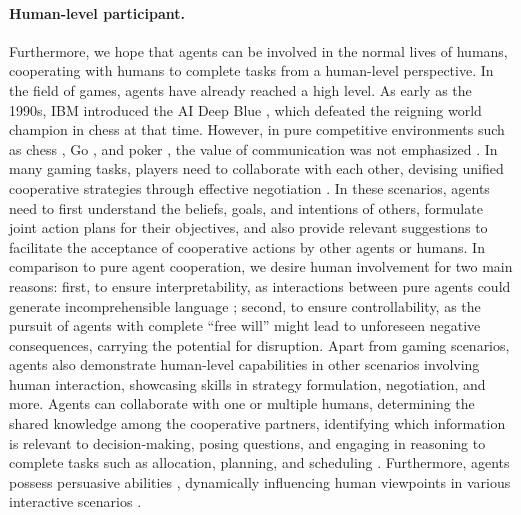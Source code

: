 \paragraph{Human-level participant.}
Furthermore, we hope that agents can be involved in the normal lives of humans, cooperating with humans to complete tasks from a human-level perspective. In the field of games, agents have already reached a high level. As early as the 1990s, IBM introduced the AI Deep Blue \cite{Campbell2002DeepB}, which defeated the reigning world champion in chess at that time. However, in pure competitive environments such as chess \cite{Campbell2002DeepB}, Go \cite{DBLP:journals/nature/SilverHMGSDSAPL16}, and poker \cite{DBLP:journals/corr/MoravcikSBLMBDW17}, the value of communication was not emphasized \cite{meta2022human}. In many gaming tasks, players need to collaborate with each other, devising unified cooperative strategies through effective negotiation \cite{DBLP:conf/iclr/Bakhtin0LGJFMB23,meta2022human,DBLP:conf/nips/CarrollSHGSAD19, bard2020hanabi}. In these scenarios, agents need to first understand the beliefs, goals, and intentions of others, formulate joint action plans for their objectives, and also provide relevant suggestions to facilitate the acceptance of cooperative actions by other agents or humans. In comparison to pure agent cooperation, we desire human involvement for two main reasons: first, to ensure interpretability, as interactions between pure agents could generate incomprehensible language \cite{DBLP:conf/nips/CarrollSHGSAD19}; second, to ensure controllability, as the pursuit of agents with complete ``free will'' might lead to unforeseen negative consequences, carrying the potential for disruption. Apart from gaming scenarios, agents also demonstrate human-level capabilities in other scenarios involving human interaction, showcasing skills in strategy formulation, negotiation, and more. Agents can collaborate with one or multiple humans, determining the shared knowledge among the cooperative partners, identifying which information is relevant to decision-making, posing questions, and engaging in reasoning to complete tasks such as allocation, planning, and scheduling \cite{DBLP:journals/corr/abs-2305-20076}. Furthermore, agents possess persuasive abilities \cite{DBLP:conf/acl/WangSKOYZY19}, dynamically influencing human viewpoints in various interactive scenarios \cite{DBLP:journals/corr/abs-2308-03313}.

